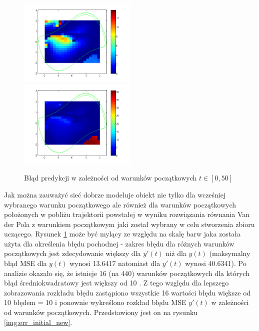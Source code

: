 \begin{figure}[ht!]
	\centering

	\subfloat
	{\includegraphics[width=0.5\textwidth]
	{images/figure_signal.png}}
	\subfloat
	{\includegraphics[width=0.5\textwidth]
	{images/figure_deriv.png}}	
	

	\caption{Błąd predykcji w zależności od warunków początkowych $t \in [0,50]$}
	\label{img:err_initial}
\end{figure}

Jak można zauważyć sieć dobrze modeluje obiekt nie tylko dla wcześniej wybranego warunku początkowego ale również dla warunków początkowych położonych w pobliżu trajektorii powstałej w wyniku rozwiązania równania Van der Pola z warunkiem początkowym jaki został wybrany w celu stworzenia zbioru uczącego. Rysunek \ref{img:err_initial} może być mylący ze względu na skalę barw jaka została użyta dla określenia błędu pochodnej - zakres błędu dla różnych warunków początkowych jest zdecydowanie większy dla $y'(t)$ niż dla $y(t)$ (maksymalny błąd MSE dla $y(t)$ wynosi 13.6417 natomiast dla $y'(t)$ wynosi 40.6341). Po analizie okazało się, że istnieje 16 (na 440) warunków początkowych dla których błąd średniokwadratowy jest większy od 10 . Z tego względu dla lepszego zobrazowania rozkładu błędu zastąpiono wszystkie 16 wartości błędu większe od 10 błędem = 10 i ponownie wykreślono rozkład błędu MSE $y'(t)$ w zależności od warunków początkowych. Przedstawiony jest on na rysunku \ref{img:err_initial_new}.

